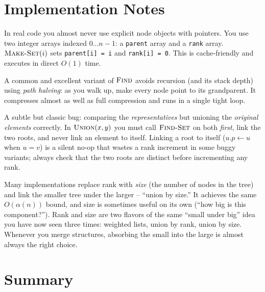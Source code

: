 \section{Implementation Notes}
\label{ch19:impl}

In real code you almost never use explicit node objects with pointers. You use
two integer arrays indexed $0 \dots n-1$: a \texttt{parent} array and a
\texttt{rank} array. $\textsc{Make-Set}(i)$ sets \lstinline|parent[i] = i| and
\lstinline|rank[i] = 0|. This is cache-friendly and executes in direct $O(1)$ time.

A common and excellent variant of $\textsc{Find}$ avoids recursion (and its
stack depth) using \emph{path halving}: as you walk up, make every node point to
its grandparent. It compresses almost as well as full compression and runs in a
single tight loop.

\begin{algorithm}[H]
\caption{\textsc{Find-Set} with path halving (iterative)}
\end{algorithm}

\begin{trapbox}
A subtle but classic bug: comparing the \emph{representatives} but unioning the
\emph{original elements} correctly. In $\textsc{Union}(x,y)$ you must call
$\textsc{Find-Set}$ on both \emph{first}, link the two roots, and never link an
element to itself. Linking a root to itself ($u.p \gets u$ when $u = v$) is a
silent no-op that wastes a rank increment in some buggy variants; always check
that the two roots are distinct before incrementing any rank.
\end{trapbox}

Many implementations replace rank with \emph{size} (the number of nodes in the
tree) and link the smaller tree under the larger -- ``union by size.'' It
achieves the same $O(\alpha(n))$ bound, and size is sometimes useful on its own
(``how big is this component?''). Rank and size are two flavors of the same
``small under big'' idea you have now seen three times: weighted lists, union by
rank, union by size. Whenever you merge structures, absorbing the small into the
large is almost always the right choice.

\section{Summary}
\label{ch19:summary}

